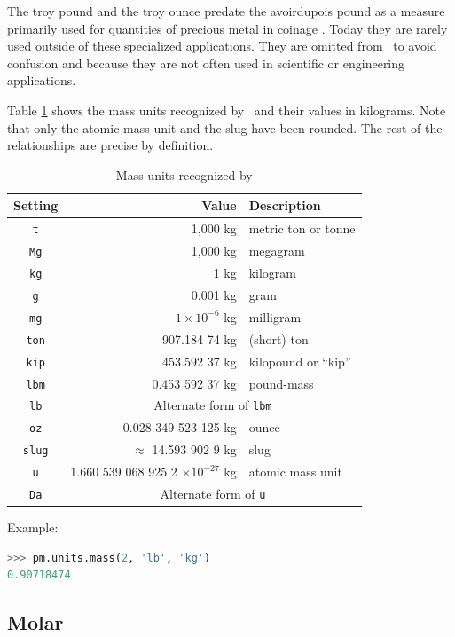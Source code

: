 The troy pound and the troy ounce predate the avoirdupois pound as a measure primarily used for quantities of precious metal in coinage \cite[p.6]{nbs:sp447}.  Today they are rarely used outside of these specialized applications.  They are omitted from \PM\ to avoid confusion and because they are not often used in scientific or engineering applications.

Table \ref{tab:mass} shows the mass units recognized by \PM\ and their values in kilograms.  Note that only the atomic mass unit and the slug have been rounded.  The rest of the relationships are precise by definition.

\begin{table}
\centering
\caption{Mass units recognized by \PM}\label{tab:mass}
\begin{tabular}{crl}
\hline
Setting & Value & Description\\
\hline
\verb|t| & 1,000 kg & metric ton or tonne\\
\verb|Mg| & 1,000 kg & megagram\\
\verb|kg| & 1 kg & kilogram\\
\verb|g| & 0.001 kg & gram\\
\verb|mg| & $1\times 10^{-6}$ kg & milligram\\
\verb|ton| & 907.184 74 kg & (short) ton\\
\verb|kip| & 453.592 37 kg & kilopound or ``kip''\\
\verb|lbm| & 0.453 592 37 kg & pound-mass\\
\verb|lb| & \multicolumn{2}{c}{Alternate form of \texttt{lbm}}\\
\verb|oz| & 0.028 349 523 125 kg & ounce\\
\verb|slug| & $\approx$ 14.593 902 9 kg & slug\\
\verb|u| & 1.660 539 068 925 2 $\times 10^{-27}$ kg & atomic mass unit\\
\verb|Da| & \multicolumn{2}{c}{Alternate form of \texttt{u}}\\
\hline
\end{tabular}
\end{table}

Example:
\begin{lstlisting}[language=Python]
>>> pm.units.mass(2, 'lb', 'kg')
0.90718474
\end{lstlisting}


%
%

\subsection{Molar}\label{sec:units:molar}

